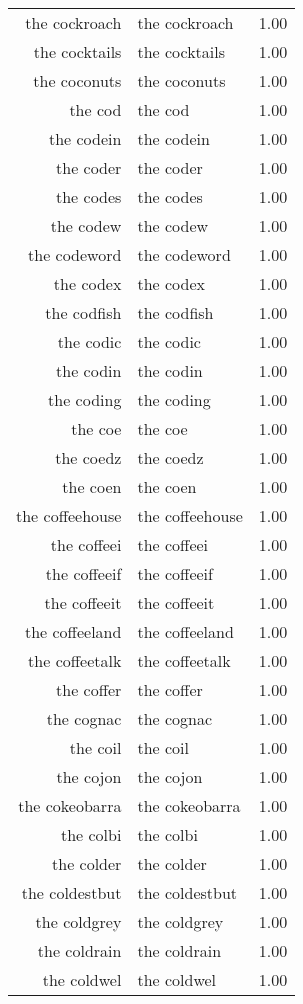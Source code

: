 \begin{table}[ht]
\begin{tabular}{rlr}
  the cockroach & the cockroach & 1.00 \\ 
  the cocktails & the cocktails & 1.00 \\ 
  the coconuts & the coconuts & 1.00 \\ 
  the cod & the cod & 1.00 \\ 
  the codein & the codein & 1.00 \\ 
  the coder & the coder & 1.00 \\ 
  the codes & the codes & 1.00 \\ 
  the codew & the codew & 1.00 \\ 
  the codeword & the codeword & 1.00 \\ 
  the codex & the codex & 1.00 \\ 
  the codfish & the codfish & 1.00 \\ 
  the codic & the codic & 1.00 \\ 
  the codin & the codin & 1.00 \\ 
  the coding & the coding & 1.00 \\ 
  the coe & the coe & 1.00 \\ 
  the coedz & the coedz & 1.00 \\ 
  the coen & the coen & 1.00 \\ 
  the coffeehouse & the coffeehouse & 1.00 \\ 
  the coffeei & the coffeei & 1.00 \\ 
  the coffeeif & the coffeeif & 1.00 \\ 
  the coffeeit & the coffeeit & 1.00 \\ 
  the coffeeland & the coffeeland & 1.00 \\ 
  the coffeetalk & the coffeetalk & 1.00 \\ 
  the coffer & the coffer & 1.00 \\ 
  the cognac & the cognac & 1.00 \\ 
  the coil & the coil & 1.00 \\ 
  the cojon & the cojon & 1.00 \\ 
  the cokeobarra & the cokeobarra & 1.00 \\ 
  the colbi & the colbi & 1.00 \\ 
  the colder & the colder & 1.00 \\ 
  the coldestbut & the coldestbut & 1.00 \\ 
  the coldgrey & the coldgrey & 1.00 \\ 
  the coldrain & the coldrain & 1.00 \\ 
  the coldwel & the coldwel & 1.00 \\ 

\end{tabular}
\end{table}
